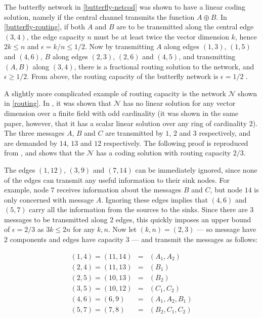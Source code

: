The butterfly network in \autoref{butterfly-netcod} was shown to have a linear coding solution, namely if the central channel transmits the function $A \oplus B$. In \autoref{butterfly-routing}, if both $A$ and $B$ are to be transmitted along the central edge $(3, 4)$, the edge capacity $n$ must be at least twice the vector dimension $k$, hence $2k \leq n$ and $\epsilon = k/n \leq 1/2$. Now by transmitting $A$ along edges $(1, 3)$, $(1, 5)$ and $(4, 6)$, $B$ along edges $(2, 3)$, $(2, 6)$ and $(4, 5)$, and transmitting $(A, B)$ along $(3, 4)$, there is a fractional routing solution to the network, and $\epsilon \geq 1/2$. From above, the routing capacity of the butterfly network is $\epsilon = 1/2$ \cite{cann2006}.

A slightly more complicated example of routing capacity is the network $\mathcal{N}$ shown in \autoref{routing}. In \cite{doug2005}, it was shown that $\mathcal{N}$ has no linear solution for any vector dimension over a finite field with odd cardinality (it was shown in the same paper, however, that it has a scalar linear solution over any ring of cardinality $2$). The three messages $A$, $B$ and $C$ are transmitted by $1$, $2$ and $3$ respectively, and are demanded by $14$, $13$ and $12$ respectively. The following proof is reproduced from \cite{cann2006}, and shows that the $\mathcal{N}$ has a coding solution with routing capacity $2/3$.

The edges $(1, 12)$, $(3, 9)$ and $(7, 14)$ can be immediately ignored, since none of the edges can transmit any useful information to their sink nodes. For example, node $7$ receives information about the messages $B$ and $C$, but node $14$ is only concerned with message $A$. Ignoring these edges implies that $(4, 6)$ and $(5, 7)$ carry all the information from the sources to the sinks. Since there are $3$ messages to be transmitted along $2$ edges, this quickly imposes an upper bound of $\epsilon = 2/3$ as $3k \leq 2n$ for any $k, n$. Now let $(k, n) = (2, 3)$ --- so message have $2$ components and edges have capacity $3$ --- and transmit the messages as follows:

\begin{eqnarray*}
  	(1, 4) = (11, 14) & = & (A_1, A_2) \\
  	(2, 4) = (11, 13) & = & (B_1) \\
  	(2, 5) = (10, 13) & = & (B_2) \\
  	(3, 5) = (10, 12) & = & (C_1, C_2) \\
  	(4, 6) = (6, 9)   & = & (A_1, A_2, B_1) \\
  	(5, 7) = (7, 8)   & = & (B_2, C_1, C_2)
\end{eqnarray*}

